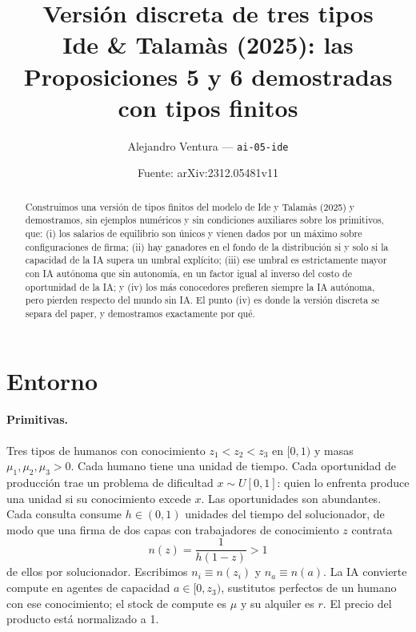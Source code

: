 \documentclass[11pt]{article}
\title{Versión discreta de tres tipos\\[4pt]
\large Ide \& Talamàs (2025): las Proposiciones 5 y 6 demostradas con tipos finitos}
\author{Alejandro Ventura --- \texttt{ai-05-ide}}
\date{Fuente: arXiv:2312.05481v11}
\theoremstyle{plain}
\theoremstyle{definition}
\theoremstyle{remark}
\newcommand{\ai}{a}
\begin{document}
\maketitle

\begin{abstract}
\noindent
Construimos una versión de tipos finitos del modelo de Ide y Talamàs (2025) y demostramos, sin
ejemplos numéricos y sin condiciones auxiliares sobre los primitivos, que: (i) los salarios de
equilibrio son únicos y vienen dados por un máximo sobre configuraciones de firma; (ii) hay ganadores
en el fondo de la distribución si y solo si la capacidad de la IA supera un umbral explícito;
(iii) ese umbral es estrictamente mayor con IA autónoma que sin autonomía, en un factor igual al
inverso del costo de oportunidad de la IA; y (iv) los más conocedores prefieren siempre la IA
autónoma, pero pierden respecto del mundo sin IA. El punto (iv) es donde la versión discreta se
separa del paper, y demostramos exactamente por qué.
\end{abstract}

\section{Entorno}

\paragraph{Primitivas.} Tres tipos de humanos con conocimiento $z_1<z_2<z_3$ en $[0,1)$ y masas
$\mu_1,\mu_2,\mu_3>0$. Cada humano tiene una unidad de tiempo. Cada oportunidad de producción trae un
problema de dificultad $x\sim U[0,1]$: quien lo enfrenta produce una unidad si su conocimiento excede
$x$. Las oportunidades son abundantes. Cada consulta consume $h\in(0,1)$ unidades del tiempo del
solucionador, de modo que una firma de dos capas con trabajadores de conocimiento $z$ contrata
\[
  n(z)=\frac{1}{h(1-z)}>1
\]
de ellos por solucionador. Escribimos $n_i\equiv n(z_i)$ y $n_a\equiv n(\ai)$. La IA convierte compute
en agentes de capacidad $\ai\in[0,z_3)$, sustitutos perfectos de un humano con ese conocimiento; el
stock de compute es $\mu$ y su alquiler es $r$. El precio del producto está normalizado a 1.
\end{document}
